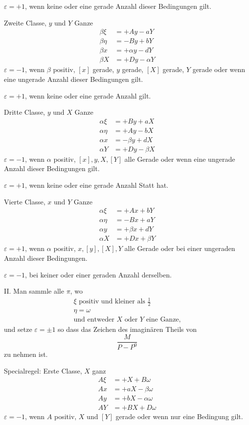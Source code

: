 $\varepsilon=+1$, wenn keine oder eine gerade Anzahl dieser Bedingungen gilt.

Zweite Classe, $y$ und $Y$ Ganze
\[
\begin{aligned}
\beta\xi&=+Ay-aY\\
\beta\eta&=-By+bY\\
\beta x&=+\alpha y-dY\\
\beta X&=+Dy-\alpha Y
\end{aligned}
\]
$\varepsilon=-1$, wenn $\beta$ positiv, $[x]$ gerade, $y$ gerade, $[X]$ gerade, $Y$ gerade oder wenn eine ungerade Anzahl dieser Bedingungen gilt.

$\varepsilon=+1$, wenn keine oder eine gerade Anzahl gilt.

Dritte Classe, $y$ und $X$ Ganze
\[
\begin{aligned}
\alpha\xi&=+By+aX\\
\alpha\eta&=+Ay-bX\\
\alpha x&=-\beta y+dX\\
\alpha Y&=+Dy-\beta X
\end{aligned}
\]
$\varepsilon=-1$, wenn $\alpha$ positiv, $[x],y,X,[Y]$ alle Gerade oder wenn eine ungerade Anzahl dieser Bedingungen gilt.

$\varepsilon=+1$, wenn keine oder eine gerade Anzahl Statt hat.

Vierte Classe, $x$ und $Y$ Ganze
\[
\begin{aligned}
\alpha\xi&=+Ax+bY\\
\alpha\eta&=-Bx+aY\\
\alpha y&=+\beta x+dY\\
\alpha X&=+Dx+\beta Y
\end{aligned}
\]
$\varepsilon=+1$, wenn $\alpha$ positiv, $x,[y],[X],Y$ alle Gerade oder bei einer ungeraden Anzahl dieser Bedingungen.

$\varepsilon=-1$, bei keiner oder einer geraden Anzahl derselben.

II. Man sammle alle $\pi$, wo
\[
\begin{array}{l}
\xi\text{ positiv und kleiner als }\frac12\\
\eta=\omega\\
\text{und entweder }X\text{ oder }Y\text{ eine Ganze,}
\end{array}
\]
und setze $\varepsilon=\pm1$ so dass das Zeichen des imaginären Theils von
\[
\frac{M}{P-P^0}
\]
zu nehmen ist.

Specialregel: Erste Classe, $X$ ganz
\[
\begin{aligned}
A\xi&=+X+B\omega\\
Ax&=+aX-\beta\omega\\
Ay&=+bX-\alpha\omega\\
AY&=+BX+D\omega
\end{aligned}
\]
$\varepsilon=-1$, wenn $A$ positiv, $X$ und $[Y]$ gerade oder wenn nur eine Bedingung gilt.

